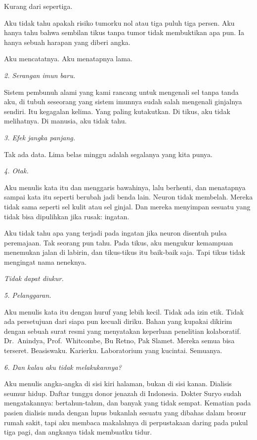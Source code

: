 \documentclass[11pt,twoside,openany]{book}
\begin{document}
Kurang dari sepertiga.

Aku tidak tahu apakah risiko tumorku nol atau tiga puluh tiga persen. Aku hanya tahu bahwa sembilan tikus tanpa tumor tidak membuktikan apa pun. Ia hanya sebuah harapan yang diberi angka.

Aku mencatatnya. Aku menatapnya lama.

\emph{2. Serangan imun baru.}

Sistem pembunuh alami yang kami rancang untuk mengenali sel tanpa tanda aku, di tubuh seseorang yang sistem imunnya sudah salah mengenali ginjalnya sendiri. Itu kegagalan kelima. Yang paling kutakutkan. Di tikus, aku tidak melihatnya. Di manusia, aku tidak tahu.

\emph{3. Efek jangka panjang.}

Tak ada data. Lima belas minggu adalah segalanya yang kita punya.

\emph{4. Otak.}

Aku menulis kata itu dan menggaris bawahinya, lalu berhenti, dan menatapnya sampai kata itu seperti berubah jadi benda lain. Neuron tidak membelah. Mereka tidak sama seperti sel kulit atau sel ginjal. Dan mereka menyimpan sesuatu yang tidak bisa dipulihkan jika rusak: ingatan.

Aku tidak tahu apa yang terjadi pada ingatan jika neuron disentuh pulsa peremajaan. Tak seorang pun tahu. Pada tikus, aku mengukur kemampuan menemukan jalan di labirin, dan tikus-tikus itu baik-baik saja. Tapi tikus tidak mengingat nama neneknya.

\emph{Tidak dapat diukur.}

\emph{5. Pelanggaran.}

Aku menulis kata itu dengan huruf yang lebih kecil. Tidak ada izin etik. Tidak ada persetujuan dari siapa pun kecuali diriku. Bahan yang kupakai dikirim dengan sebuah surat resmi yang menyatakan keperluan penelitian kolaboratif. Dr.~Anindya, Prof.~Whitcombe, Bu Retno, Pak Slamet. Mereka semua bisa terseret. Beasiswaku. Karierku. Laboratorium yang kucintai. Semuanya.

\emph{6. Dan kalau aku tidak melakukannya?}

Aku menulis angka-angka di sisi kiri halaman, bukan di sisi kanan. Dialisis seumur hidup. Daftar tunggu donor jenazah di Indonesia. Dokter Suryo sudah mengatakannya: bertahun-tahun, dan banyak yang tidak sempat. Kematian pada pasien dialisis muda dengan lupus bukanlah sesuatu yang dibahas dalam brosur rumah sakit, tapi aku membaca makalahnya di perpustakaan daring pada pukul tiga pagi, dan angkanya tidak membuatku tidur.
\end{document}
